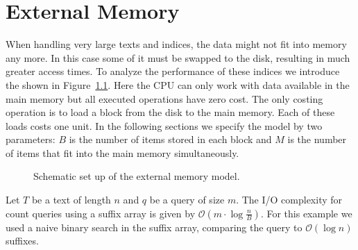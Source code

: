 \chapter{External Memory}

When handling very large texts and indices, the data might not fit into memory any more. In this case some of it must be swapped to the disk, resulting in much greater access times. To analyze the performance of these indices we introduce the  shown in Figure~\ref{fig:externalMemoryModel}. Here the CPU can only work with data available in the main memory but all executed operations have zero cost. The only costing operation is to load a block from the disk to the main memory. Each of these loads costs one unit. In the following sections we specify the model by two parameters: $B$ is the number of items stored in each block and $M$ is the number of items that fit into the main memory simultaneously.

\begin{figure}[htb]
  \centering
  
  \caption{Schematic set up of the external memory model.}
  \label{fig:externalMemoryModel}
\end{figure}

\begin{Example}
  Let $T$ be a text of length $n$ and $q$ be a query of size $m$. The I/O complexity for count queries using a suffix array is given by $\mathcal{O}(m\cdot\log\frac{n}{B})$. For this example we used a naive binary search in the suffix array, comparing the query to $\mathcal{O}(\log n)$ suffixes.
\end{Example}




